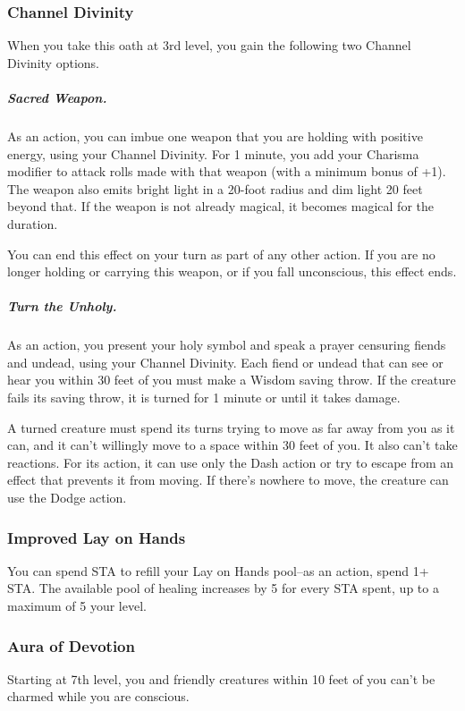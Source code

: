 \subsubsection{Channel Divinity}

When you take this oath at 3rd level, you gain the following two Channel Divinity options.

\subparagraph*{Sacred Weapon.} As an action, you can imbue one weapon that you are holding with positive energy, using your Channel Divinity. For 1 minute, you add your Charisma modifier to attack rolls made with that weapon (with a minimum bonus of +1). The weapon also emits bright light in a 20-foot radius and dim light 20 feet beyond that. If the weapon is not already magical, it becomes magical for the duration.

You can end this effect on your turn as part of any other action. If you are no longer holding or carrying this weapon, or if you fall unconscious, this effect ends.

\subparagraph*{Turn the Unholy.} As an action, you present your holy symbol and speak a prayer censuring fiends and undead, using your Channel Divinity. Each fiend or undead that can see or hear you within 30 feet of you must make a Wisdom saving throw. If the creature fails its saving throw, it is turned for 1 minute or until it takes damage.

A turned creature must spend its turns trying to move as far away from you as it can, and it can't willingly move to a space within 30 feet of you. It also can't take reactions. For its action, it can use only the Dash action or try to escape from an effect that prevents it from moving. If there's nowhere to move, the creature can use the Dodge action.

\subsubsection{Improved Lay on Hands}
You can spend STA to refill your Lay on Hands pool--as an action, spend 1+ STA. The available pool of healing increases by 5 for every STA spent, up to a maximum of 5 \texttimes your level.

\subsubsection{Aura of Devotion}

Starting at 7th level, you and friendly creatures within 10 feet of you can't be charmed while you are conscious.

